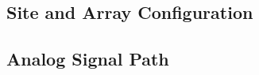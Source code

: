 \documentclass[12pt]{amsart}
\begin{document}

\subsection{Site and Array Configuration}






\subsection{Analog Signal Path}
\label{sec:analog_path}





\end{document}
